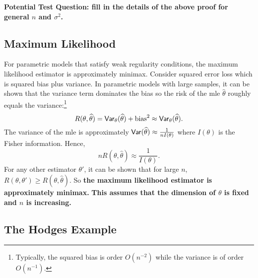\documentclass[twoside,12pt]{article}
\newcommand{\V}{\mbox{${\sf Var}$}}
\begin{document}
{\bf Potential Test Question: fill in the details of the above proof
for general $n$ and $\sigma^2$.}







\subsection{Maximum Likelihood}

For parametric models
that satisfy weak regularity conditions,
the maximum likelihood estimator is approximately minimax.
Consider squared error loss which is squared bias plus variance.
In parametric models with large samples,
it can be shown that the variance term dominates the bias 
so the risk of the {\rm mle} $\widehat{\theta}$ roughly 
equals the variance:\footnote{{\sf Typically, the squared bias is order $O(n^{-2})$
while the variance is of order $O(n^{-1})$.}}
\begin{equation}
R(\theta,\widehat{\theta})= \V_\theta(\widehat{\theta}) + {\rm bias}^2 \approx
\V_\theta(\widehat{\theta}).
\end{equation}
The variance 
of the {\rm mle} is approximately
$\V(\widehat{\theta})\approx \frac{1}{n I(\theta)}$
where
$I(\theta)$ is the Fisher information.
Hence,
\begin{equation}
nR(\theta,\widehat{\theta})\approx \frac{1}{I(\theta)}.
\end{equation}
For any other estimator $\theta'$,
it can be shown that for large $n$,
$R(\theta,\theta')\geq R(\theta,\widehat{\theta})$.
So {\bf the maximum likelihood estimator is approximately minimax.}
{\bf This assumes that the dimension of $\theta$ is fixed
and $n$ is increasing.}





\subsection{The Hodges Example}
\end{document}
